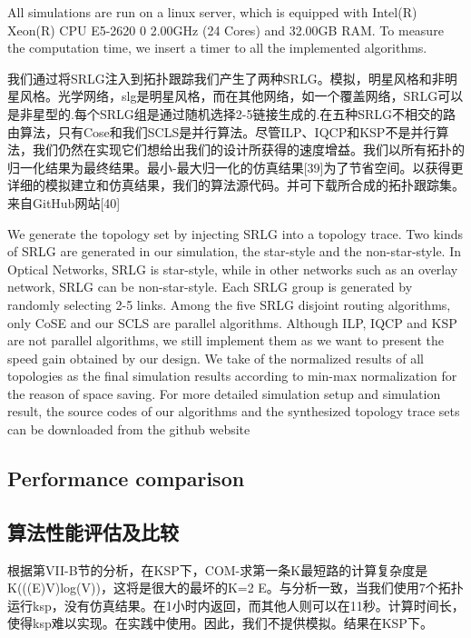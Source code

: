All simulations are run on a linux server, which is equipped with Intel(R) Xeon(R) CPU E5-2620 0 \@ 2.00GHz (24 Cores) and 32.00GB RAM. To measure the computation time, we insert a timer to all the implemented algorithms.


我们通过将SRLG注入到拓扑跟踪我们产生了两种SRLG。模拟，明星风格和非明星风格。光学网络，slg是明星风格，而在其他网络，如一个覆盖网络，SRLG可以是非星型的.每个SRLG组是通过随机选择2-5链接生成的.在五种SRLG不相交的路由算法，只有Cose和我们SCLS是并行算法。尽管ILP、IQCP和KSP不是并行算法，我们仍然在实现它们想给出我们的设计所获得的速度增益。我们以所有拓扑的归一化结果为最终结果。最小-最大归一化的仿真结果[39]为了节省空间。以获得更详细的模拟建立和仿真结果，我们的算法源代码。并可下载所合成的拓扑跟踪集。来自GitHub网站[40]


We generate the topology set by injecting SRLG into a topology trace. Two kinds of SRLG are generated in our simulation, the star-style and the non-star-style. In Optical Networks, SRLG is star-style, while in other networks such as an overlay network, SRLG can be non-star-style. Each SRLG group is generated by randomly selecting 2-5 links. Among the five SRLG disjoint routing algorithms, only CoSE and our SCLS are parallel algorithms. Although ILP, IQCP and KSP are not parallel algorithms, we still implement them as we want to present the speed gain obtained by our design. We take of the normalized results  of all topologies as the final simulation results according to min-max normalization \cite{tax2000feature} for the reason of space saving. For more detailed simulation setup and simulation result, the source codes of our algorithms and the synthesized topology trace sets can be downloaded from the github website \cite{code}




\subsection{Performance comparison}



\subsection{算法性能评估及比较}
根据第VII-B节的分析，在KSP下，COM-求第一条K最短路的计算复杂度是K(((E)V)log(V))，这将是很大的最坏的K=2 E。与分析一致，当我们使用7个拓扑运行ksp，没有仿真结果。在1小时内返回，而其他人则可以在11秒。计算时间长，使得ksp难以实现。在实践中使用。因此，我们不提供模拟。结果在KSP下。


